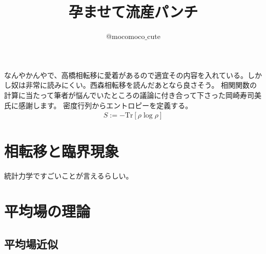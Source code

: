 \documentclass[autodetect-engine,dvipdfmx-if-dvi,ja=standard]{bxjsarticle}
\theoremstyle{break}
\begin{document}
    \title{孕ませて流産パンチ}
    \author{@mocomoco$\_$cute}
    \maketitle
    \tableofcontents
    \newpage
    なんやかんやで、高橋相転移に愛着があるので適宜その内容を入れている。しかし奴は非常に読みにくい。西森相転移を読んだあとなら良さそう。
    相関関数の計算に当たって筆者が悩んでいたところの議論に付き合って下さった岡崎寿司美氏に感謝します。
    密度行列からエントロピーを定義する。
    \begin{align}
        S:=-\mathrm{Tr}[\rho\log\rho]
    \end{align}

    \section{相転移と臨界現象}
        統計力学ですごいことが言えるらしい。
    \section{平均場の理論}
        \subsection{平均場近似}
            
\end{document}
